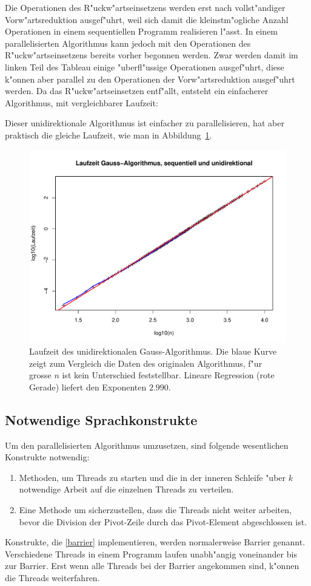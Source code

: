 Die Operationen des R"uckw"artseinsetzens werden erst nach vollst"andiger
Vorw"artsreduktion ausgef"uhrt, weil sich damit die kleinstm"ogliche
Anzahl Operationen in einem sequentiellen Programm realisieren l"asst.
In einem parallelisierten Algorithmus kann jedoch mit den Operationen
des R"uckw"artseinsetzens bereits vorher begonnen werden. Zwar werden damit
im linken Teil des Tableau einige "uberfl"ussige Operationen ausgef"uhrt,
diese k"onnen aber parallel zu den Operationen der Vorw"artsreduktion
ausgef"uhrt werden.
Da das R"uckw"arts\-einsetzen entf"allt, entsteht ein einfacherer Algorithmus,
mit vergleichbarer Laufzeit:

Dieser unidirektionale Algorithmus ist einfacher zu parallelisieren, hat
aber praktisch die gleiche Laufzeit, wie man in Abbildung~\ref{gauss-uni}.
\begin{figure}
\begin{center}
\includegraphics[width=\hsize]{images/gauss-uni.pdf}
\end{center}
\caption{Laufzeit des unidirektionalen Gauss-Algorithmus. Die blaue Kurve
zeigt zum Vergleich die Daten des originalen Algorithmus, f"ur grosse
$n$ ist kein Unterschied feststellbar.
Lineare Regression (rote Gerade) liefert den Exponenten $2.990$.
\label{gauss-uni}}
\end{figure}
\subsection{Notwendige Sprachkonstrukte}
Um den parallelisierten Algorithmus umzusetzen, sind folgende wesentlichen
Konstrukte notwendig:
\begin{enumerate}
\item Methoden, um Threads zu starten und die in der inneren Schleife "uber
$k$ notwendige Arbeit auf die einzelnen Threads zu verteilen.
\item Eine Methode um sicherzustellen, dass die Threads nicht weiter 
arbeiten, bevor die Division der Pivot-Zeile durch das Pivot-Element
abgeschlossen ist.
\label{barrier}
\end{enumerate}
Konstrukte, die \ref{barrier} implementieren, werden normalerweise
Barrier genannt.
Verschiedene Threads in einem Programm laufen
unabh"angig voneinander bis zur Barrier. Erst wenn alle Threads
bei der Barrier angekommen sind, k"onnen die Threads weiterfahren.

